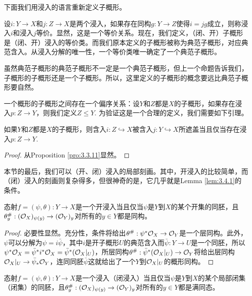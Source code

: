 下面我们用浸入的语言重新定义子概形。

\begin{para}[子概形]
	设$i:Y\to X$和$j:Z\to X$是两个浸入，如果存在同构$g:Y\to Z$使得$i=jg$成立，则称浸入$i$和浸入$j$等价。显然，这是一个等价关系。现在，我们定义，（闭、开）子概形是（闭、开）浸入的等价类。而我们原本定义的子概形被称为典范子概形，对应典范含入。从浸入分解的唯一性，一个等价类唯一确定了一个典范子概形。

	虽然典范子概形的典范子概形不一定是一个典范子概形，但上一个命题告诉我们，子概形的子概形还是一个子概形。所以，这里定义的子概形的概念要远比典范子概形要自然。
\end{para}

\begin{para}[子概形的偏序关系]
	一个概形的子概形之间存在一个偏序关系：设$Y$和$Z$都是$X$的子概形，如果存在浸入$p:Z\to Y$，则我们定义$Z\leq Y$. 为验证这是一个合理的定义，我们需要如下引理。
\end{para}

\begin{lem}
如果$Y$和$Z$都是$X$的子概形，则含入$i:Z\hookrightarrow X$被含入$j:Y\hookrightarrow X$所遮盖当且仅当存在浸入$p:Z\to Y$.
\end{lem}

\begin{proof}
从Proposition \ref{pro:3.3.11}显然。
\end{proof}

本节的最后，我们可以（开、闭）浸入的局部刻画。其中，开浸入的比较简单，而（闭）浸入的刻画则复杂得多，但很神奇的是，它几乎就是Lemma \ref{lem:3.4.1}的条件。

\begin{pro}
态射$f=(\psi,\theta):Y\to X$是一个开浸入当且仅当$\psi$是$Y$到$X$的某个开集的同胚，且$\theta^\#_y:(\mathcal{O}_X)_{\psi(y)}\to (\mathcal{O}_Y)_y$对所有的$y\in Y$都是同构。
\end{pro}

\begin{proof}
必要性显然。充分性，条件将给出$\theta^\#:\psi^*\mathcal{O}_X\to \mathcal{O}_Y$是一个层同构。此外，$\psi$可以分解为$\psi=i\bar\psi$，其中$i$是开子概形$U$的典范含入而$\bar\psi:Y\to U$是一个同胚，所以$\psi^*\mathcal{O}_X=\bar\psi^* i^*\mathcal{O}_X=\bar\psi^*(\mathcal{O}_X|_U)$，所层同构$\theta^\#:\bar\psi^*(\mathcal{O}_X|_U)\to \mathcal{O}_Y$将给出层同构$\mathcal{O}_X|_U\to \bar\psi_*\mathcal{O}_Y$，连同同胚$\bar\psi$这就给出了一个$Y$到$\mathcal{O}_X|_U$的概形同构。
\end{proof}

\begin{pro}\label{pro:3.4.11}
态射$f=(\psi,\theta):Y\to X$是一个浸入（闭浸入）当且仅当$\psi$是$Y$到$X$的某个局部闭集（闭集）的同胚，且$\theta^\#_y:(\mathcal{O}_X)_{\psi(y)}\to (\mathcal{O}_Y)_y$对所有的$y\in Y$都是满同态。
\end{pro}

